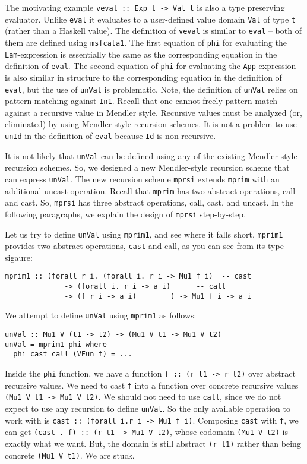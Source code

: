 The motivating example \lstinline{veval :: Exp t -> Val t} is also 
a type preserving evaluator. Unlike \lstinline{eval} it evaluates to 
a user-defined value domain \lstinline{Val} of type \lstinline{t} (rather
than a Haskell value). The definition of \lstinline{veval} is similar to
\lstinline{eval} -- both of them are defined using \lstinline{msfcata1}.
The first equation of \lstinline{phi} for evaluating
the \lstinline{Lam}-expression is essentially the same as
the corresponding equation in the definition of \lstinline{eval}.
The second equation of \lstinline{phi} for evaluating
the \lstinline{App}-expression is also similar in structure to
the corresponding equation in the definition of \lstinline{eval},
but the use of \lstinline{unVal} is problematic. Note, the definition of
\lstinline{unVal} relies on pattern matching against \lstinline{In1}.
Recall that one cannot freely pattern match against a recursive value
in Mendler style. Recursive values must be analyzed (or, eliminated) by
using Mendler-style recursion schemes. It is not a problem to use
\lstinline{unId} in the definition of \lstinline{eval} because
\lstinline{Id} is non-recursive.

It is not likely that \lstinline{unVal} can be defined using any of
the existing Mendler-style recursion schemes. So, we designed
a new Mendler-style recursion scheme that can express \lstinline{unVal}.
The new recursion scheme \lstinline{mprsi} extends \lstinline{mprim} with
an additional uncast operation. Recall that \lstinline{mprim} has
two abstract operations, call and cast. So, \lstinline{mprsi} has
three abstract operations, call, cast, and uncast. In the following paragraphs,
we explain the design of \lstinline{mprsi} step-by-step.

Let us try to define \lstinline{unVal} using \lstinline{mprim1}, and see
where it falls short. \lstinline{mprim1} provides two abstract operations,
\lstinline{cast} and {call}, as you can see from its type sigaure:
\begin{lstlisting}
mprim1 :: (forall r i. (forall i. r i -> Mu1 f i)  -- cast
              -> (forall i. r i -> a i)      -- call
              -> (f r i -> a i)        ) -> Mu1 f i -> a i
\end{lstlisting}
We attempt to define \lstinline{unVal} using \lstinline{mprim1} as follows:
\begin{lstlisting}
unVal :: Mu1 V (t1 -> t2) -> (Mu1 V t1 -> Mu1 V t2)
unVal = mprim1 phi where
  phi cast call (VFun f) = ...
\end{lstlisting}
Inside the \lstinline{phi} function, we have a function
\lstinline{f :: (r t1 -> r t2)} over abstract recursive values.
We need to cast \lstinline{f} into a function over concrete recursive values
\lstinline{(Mu1 V t1 -> Mu1 V t2)}.
We should not need to use \lstinline{call}, since we do not expect
to use any recursion to define \lstinline{unVal}.
So the only available operation to
work with is \lstinline{cast :: (forall i.r i -> Mu1 f i)}.
Composing \lstinline{cast} with \lstinline{f}, we can get
\lstinline{(cast . f) :: (r t1 -> Mu1 V t2)}, whose codomain
\lstinline{(Mu1 V t2)} is exactly what we want. But, the domain
is still abstract \lstinline{(r t1)} rather than being concrete
\lstinline{(Mu1 V t1)}. We are stuck.


